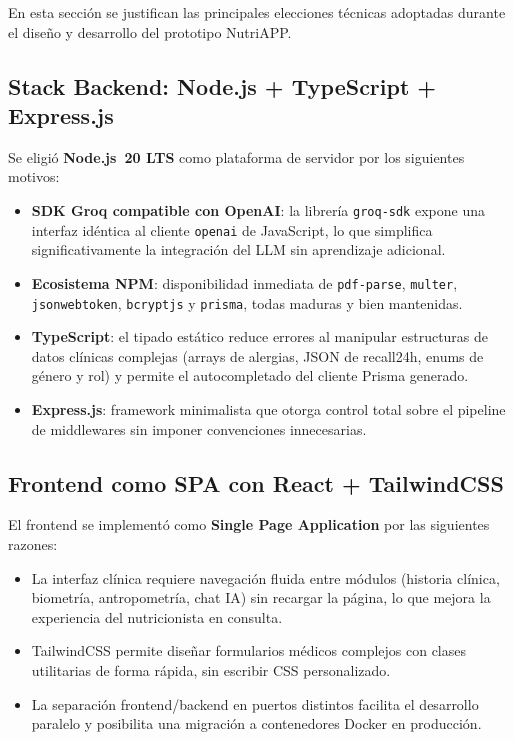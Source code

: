 \documentclass[12pt,a4paper]{article}
\begin{document}
En esta sección se justifican las principales elecciones técnicas adoptadas durante
el diseño y desarrollo del prototipo NutriAPP.

\subsection{Stack Backend: Node.js + TypeScript + Express.js}

Se eligió \textbf{Node.js~20 LTS} como plataforma de servidor por los siguientes
motivos:

\begin{itemize}[leftmargin=1.5em]
  \item \textbf{SDK Groq compatible con OpenAI}: la librería \texttt{groq-sdk} expone
        una interfaz idéntica al cliente \texttt{openai} de JavaScript, lo que simplifica
        significativamente la integración del LLM sin aprendizaje adicional.
  \item \textbf{Ecosistema NPM}: disponibilidad inmediata de \texttt{pdf-parse},
        \texttt{multer}, \texttt{jsonwebtoken}, \texttt{bcryptjs} y \texttt{prisma},
        todas maduras y bien mantenidas.
  \item \textbf{TypeScript}: el tipado estático reduce errores al manipular estructuras
        de datos clínicas complejas (arrays de alergias, JSON de recall24h, enums de
        género y rol) y permite el autocompletado del cliente Prisma generado.
  \item \textbf{Express.js}: framework minimalista que otorga control total sobre el
        pipeline de middlewares sin imponer convenciones innecesarias.
\end{itemize}

\subsection{Frontend como SPA con React + TailwindCSS}

El frontend se implementó como \textbf{Single Page Application} por las siguientes
razones:

\begin{itemize}[leftmargin=1.5em]
  \item La interfaz clínica requiere navegación fluida entre módulos (historia clínica,
        biometría, antropometría, chat IA) sin recargar la página, lo que mejora la
        experiencia del nutricionista en consulta.
  \item TailwindCSS permite diseñar formularios médicos complejos con clases
        utilitarias de forma rápida, sin escribir CSS personalizado.
  \item La separación frontend/backend en puertos distintos facilita el desarrollo
        paralelo y posibilita una migración a contenedores Docker en producción.
\end{itemize}
\end{document}
